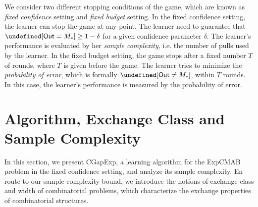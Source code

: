 \documentclass{article}
\newcommand{\Algorithm}{{\small \textsf{CGapExp}}\xspace}
\newcommand{\Problem}{{\small \textsf{ExpCMAB}}\xspace}
\newcommand{\M}{\mathcal M}
\newcommand{\RR}{\mathbb R}
\newcommand{\out}{\mathsf{Out}}
\let\Pr\undefined
\DeclareMathOperator{\Pr}{Pr}
\newcommand{\MultiIdent}{\textsc{TopK}\xspace}
\newcommand{\MultiBandit}{\textsc{MB}\xspace}
\renewcommand{\vec}[1]{\boldsymbol{#1}}
\begin{document}
We consider two different stopping conditions of the game, which are known as \emph{fixed confidence} setting and \emph{fixed budget} setting.
In the fixed confidence setting, the learner can stop the game at any point. 
The learner need to guarantee that $\Pr[\out = M_*] \ge 1-\delta$ for a given confidence parameter $\delta$.
The learner's performance is evaluated by her \emph{sample complexity}, i.e. the number of pulls used by the learner.
In the fixed budget setting, the game stops after a fixed number $T$ of rounds, where $T$ is given before the game.
The learner tries to minimize the \emph{probability of error}, which is formally $\Pr[\out \not= M_*]$, within $T$ rounds.
In this case, the learner's performance is measured by the probability of error.






\section{Algorithm, Exchange Class and Sample Complexity}


In this section, we present \Algorithm, a learning algorithm for the \Problem problem in the fixed confidence setting, and analyze its sample complexity. 
En route to our sample complexity bound, we introduce the notions of exchange class and width of combinatorial problems, which characterize the exchange properties of combinatorial structures.
\end{document}
